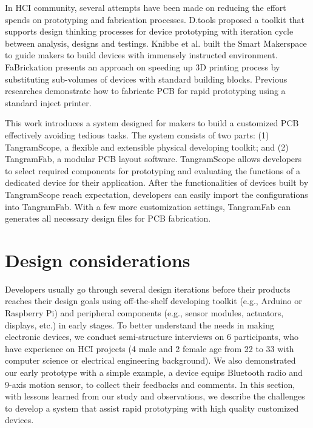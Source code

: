In HCI community, several attempts have been made on reducing the effort spends on prototyping and fabrication processes.
D.tools \cite{dtool:2006} proposed a toolkit that supports design thinking processes for device prototyping with iteration cycle between analysis, designs and testings. 
Knibbe et al. \cite{Makerspace:2015} built the Smart Makerspace to guide makers to build devices with immensely instructed environment. %
FaBrickation \cite{Mueller:2014:FFP:2556288.2557005} presents an approach on speeding up 3D printing process by substituting sub-volumes of devices with standard building blocks. %
Previous researches \cite{Printem:2015, inkjet_circuits:2013} demonstrate how to fabricate PCB for rapid prototyping using a standard inject printer. %

This work introduces a system designed for makers to build a customized PCB effectively avoiding tedious tasks.
The system consists of two parts: (1) TangramScope, a flexible and extensible physical developing toolkit; and (2) TangramFab, a modular PCB layout software.
TangramScope allows developers to select required components for prototyping and evaluating the functions of a dedicated device for their application. 
After the functionalities of devices built by TangramScope reach expectation, developers can easily import the configurations into TangramFab.
With a few more customization settings, TangramFab can generates all necessary design files for PCB fabrication.

\section{Design considerations}

Developers usually go through several design iterations before their products reaches their design goals using off-the-shelf developing toolkit (e.g., Arduino or Raspberry Pi) and peripheral components (e.g., sensor modules, actuators, displays, etc.) in early stages.
To better understand the needs in making electronic devices, we conduct semi-structure interviews on 6 participants, who have experience on HCI projects (4 male and 2 female age from 22 to 33 with computer science or electrical engineering background).
We also demonstrated our early prototype with a simple example, a device equips Bluetooth radio and 9-axis motion sensor, to collect their feedbacks and comments.
In this section, with lessons learned from our study and observations, we describe the challenges to develop a system that assist rapid prototyping with high quality customized devices.

